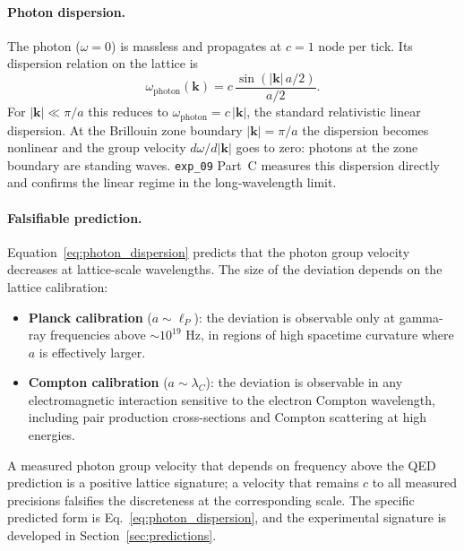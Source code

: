 \paragraph{Photon dispersion.}
The photon ($\omega = 0$) is massless and propagates at $c = 1$
node per tick. Its dispersion relation on the lattice is
\begin{equation}
    \omega_\text{photon}(\mathbf{k})
        = c\,\frac{\sin(|\mathbf{k}|\,a/2)}{a/2}.
    \label{eq:photon_dispersion}
\end{equation}
For $|\mathbf{k}| \ll \pi/a$ this reduces to
$\omega_\text{photon} = c\,|\mathbf{k}|$, the standard relativistic
linear dispersion.
At the Brillouin zone boundary $|\mathbf{k}| = \pi/a$ the dispersion
becomes nonlinear and the group velocity
$d\omega/d|\mathbf{k}|$ goes to zero: photons at the zone boundary
are standing waves. \texttt{exp\_09} Part~C measures this dispersion
directly and confirms the linear regime in the long-wavelength limit.

\paragraph{Falsifiable prediction.}
Equation~\eqref{eq:photon_dispersion} predicts that the photon
group velocity decreases at lattice-scale wavelengths. The size of
the deviation depends on the lattice calibration:

\begin{itemize}
    \item \textbf{Planck calibration} ($a \sim \ell_P$): the
    deviation is observable only at gamma-ray frequencies above
    $\sim 10^{19}$ Hz, in regions of high spacetime curvature where
    $a$ is effectively larger.
    \item \textbf{Compton calibration} ($a \sim \lambda_C$): the
    deviation is observable in any electromagnetic interaction
    sensitive to the electron Compton wavelength, including pair
    production cross-sections and Compton scattering at high energies.
\end{itemize}

A measured photon group velocity that depends on frequency above the
QED prediction is a positive lattice signature; a velocity that
remains $c$ to all measured precisions falsifies the discreteness
at the corresponding scale. The specific predicted form is
Eq.~\eqref{eq:photon_dispersion}, and the experimental signature is
developed in Section~\ref{sec:predictions}.

